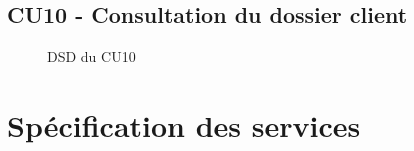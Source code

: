 \subsection{CU10 - Consultation du dossier client}
\begin{figure}[H]
\noindent{}
\caption{DSD du CU10}
\end{figure}


\section{Spécification des services}


